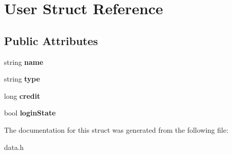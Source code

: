 \hypertarget{struct_user}{\section{User Struct Reference}
\label{struct_user}
}
\subsection*{Public Attributes}
\begin{DoxyCompactItemize}
\item 
\hypertarget{struct_user_a643f85779a4693855c171c396f49e515}{string {\bfseries name}}\label{struct_user_a643f85779a4693855c171c396f49e515}

\item 
\hypertarget{struct_user_a96c341b10272580def215fcdccfa0d5e}{string {\bfseries type}}\label{struct_user_a96c341b10272580def215fcdccfa0d5e}

\item 
\hypertarget{struct_user_ad66377ceb5718f1daaaefe29afe00167}{long {\bfseries credit}}\label{struct_user_ad66377ceb5718f1daaaefe29afe00167}

\item 
\hypertarget{struct_user_a93fc448696fb8e8f65bd76dd8e282bae}{bool {\bfseries login\+State}}\label{struct_user_a93fc448696fb8e8f65bd76dd8e282bae}

\end{DoxyCompactItemize}


The documentation for this struct was generated from the following file\+:\begin{DoxyCompactItemize}
\item 
data.\+h\end{DoxyCompactItemize}

